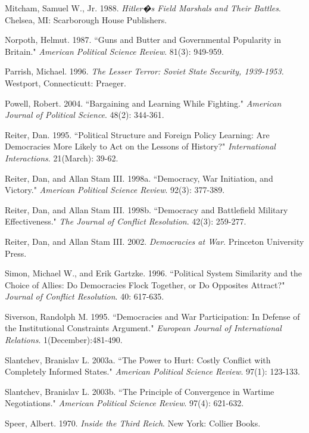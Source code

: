 \documentclass[11pt,]{article}
\begin{document}
\begin{thebibliography}{}
\bibitem{} Mitcham, Samuel W., Jr.  1988.  \textit{Hitler�s Field Marshals and Their Battles}.  Chelsea, MI:  Scarborough House Publishers.

\bibitem{} Norpoth, Helmut.  1987.  ``Guns and Butter and Governmental Popularity in Britain."  \textit{American Political Science Review}.  81(3): 949-959.

\bibitem{} Parrish, Michael.  1996.  \textit{The Lesser Terror:  Soviet State Security, 1939-1953. } Westport, Connecticutt:  Praeger.

\bibitem{} Powell, Robert.  2004. ``Bargaining and Learning While Fighting."  \textit{American Journal of Political Science}.  48(2): 344-361.

\bibitem{} Reiter, Dan.  1995.  ``Political Structure and Foreign Policy Learning: Are Democracies More Likely to Act on the Lessons of History?"  \textit{International Interactions}.  21(March): 39-62.

\bibitem{} Reiter, Dan, and Allan Stam III.  1998a.  ``Democracy, War Initiation, and Victory."  \textit{American Political Science Review}.  92(3): 377-389.

\bibitem{} Reiter, Dan, and Allan Stam III.  1998b.  ``Democracy and Battlefield Military Effectiveness."  \textit{The Journal of Conflict Resolution}.  42(3): 259-277.

\bibitem{} Reiter, Dan, and Allan Stam III.  2002.  \textit{Democracies at War}.  Princeton University Press.

\bibitem{} Simon, Michael W., and Erik Gartzke.  1996.  ``Political System Similarity and the Choice of Allies: Do Democracies Flock Together, or Do Opposites Attract?"  \textit{Journal of Conflict Resolution}.  40: 617-635.

\bibitem{} Siverson, Randolph M.  1995.  ``Democracies and War Participation: In Defense of the Institutional Constraints Argument."  \textit{European Journal of International Relations}.  1(December):481-490.

\bibitem{} Slantchev, Branislav L.  2003a.  ``The Power to Hurt: Costly Conflict with Completely Informed States."  \textit{American Political Science Review}.  97(1): 123-133.

\bibitem{} Slantchev, Branislav L.  2003b.  ``The Principle of Convergence in Wartime Negotiations."  \textit{American Political Science Review}.  97(4): 621-632.

\bibitem{} Speer, Albert.  1970.  \textit{Inside the Third Reich}.  New York:  Collier Books.


\end{thebibliography}
\end{document}
